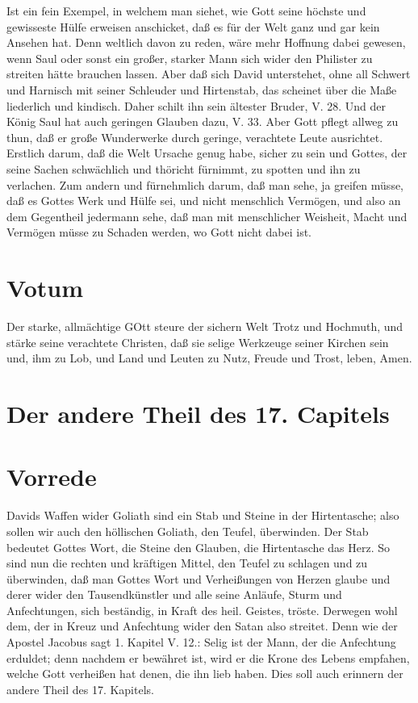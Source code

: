 Ist ein fein Exempel, in welchem man siehet, wie Gott seine höchste und gewisseste Hülfe erweisen anschicket, daß es für der Welt ganz und gar kein Ansehen hat. Denn weltlich davon zu reden, wäre mehr Hoffnung dabei gewesen, wenn Saul oder sonst ein großer, starker Mann sich wider den Philister zu streiten hätte brauchen lassen. Aber daß sich David unterstehet, ohne all Schwert und Harnisch mit seiner Schleuder
und Hirtenstab, das scheinet über die Maße liederlich und kindisch. Daher schilt ihn sein ältester Bruder, V. 28. Und der König Saul hat auch geringen Glauben dazu, V. 33. Aber Gott pflegt allweg zu thun, daß er große Wunderwerke durch geringe, verachtete Leute ausrichtet. Erstlich darum, daß die Welt Ursache genug habe, sicher zu sein und Gottes, der seine Sachen schwächlich und thöricht fürnimmt, zu spotten und ihn zu verlachen. Zum andern und fürnehmlich darum, daß man sehe, ja greifen müsse, daß es Gottes Werk und Hülfe sei, und nicht menschlich Vermögen, und also an dem Gegentheil jedermann sehe, daß man mit menschlicher Weisheit, Macht und Vermögen müsse zu Schaden werden, wo Gott nicht dabei ist.

\section{Votum}

Der starke, allmächtige GOtt steure der sichern Welt Trotz und Hochmuth, und stärke seine verachtete Christen, daß sie selige Werkzeuge seiner Kirchen sein und, ihm zu Lob, und Land und Leuten zu Nutz, Freude und Trost, leben, Amen.

\section{Der andere Theil des 17. Capitels}

\section{Vorrede}

Davids Waffen wider Goliath sind ein Stab und Steine in der Hirtentasche; also sollen wir auch den höllischen Goliath, den Teufel, überwinden. Der Stab bedeutet Gottes Wort, die Steine den Glauben, die Hirtentasche das Herz. So sind nun die rechten und kräftigen Mittel, den Teufel zu schlagen und zu überwinden, daß man Gottes Wort und Verheißungen von Herzen glaube und derer wider den Tausendkünstler und alle seine Anläufe, Sturm und Anfechtungen, sich beständig, in Kraft des heil. Geistes, tröste. Derwegen wohl dem, der in Kreuz und Anfechtung wider den Satan also streitet. Denn wie der Apostel Jacobus sagt 1. Kapitel V. 12.: Selig ist der Mann, der die Anfechtung erduldet; denn nachdem er bewähret ist, wird er die Krone des Lebens empfahen, welche Gott verheißen hat denen, die ihn lieb haben. Dies soll auch erinnern der andere Theil des 17. Kapitels.


